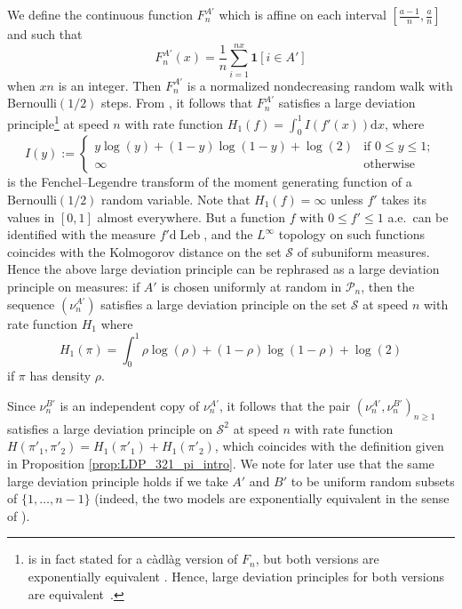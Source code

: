 \documentclass[a4paper,11pt]{amsart}
\newcommand{\One}{\bm 1}
\DeclareMathOperator{\Leb}{Leb}
\theoremstyle{definition}
\begin{document}
We define the continuous function $F_n^{A'}$ which is affine on each interval $[\frac{a-1}{n}, \frac a n ]$ and such that
\[F_n^{A'}(x)=\frac{1}{n} \sum_{i=1}^{nx} \One[i \in A']\]
when $xn$ is an integer. 
Then $F_n^{A'}$ is a normalized nondecreasing random walk with $\mathrm{Bernoulli}(1/2)$ steps.
From \cite[Theorem 5.1.2]{dembo1998large-deviations}, it follows
that $F_n^{A'}$ satisfies a large deviation principle\footnote{
    \cite[Theorem 5.1.2]{dembo1998large-deviations} is in fact stated for a càdlàg version of $F_n$,
    but both versions are exponentially equivalent \cite[Lemma 5.1.4]{dembo1998large-deviations}.
    Hence, large deviation principles for both versions are equivalent~\cite[Theorem 4.2.13]{dembo1998large-deviations}.
} at speed $n$ with rate function
$H_1(f)= \int_{0}^1 I(f'(x)) \mathrm{d}x$,
where 
\[I(y) := \begin{cases}  y \log(y)+(1-y)\log(1-y) +\log(2) & \text{if $0 \le y \le 1$};\\
\infty &\text{otherwise}\end{cases}\] is the Fenchel--Legendre transform of the moment generating function of a 
$\mathrm{Bernoulli}(1/2)$ random variable.
Note that $H_1(f)=\infty$ unless $f'$ takes its values in $[0,1]$ almost everywhere. But a function $f$ with $0 \le f' \le 1$ a.e.~can be identified with the measure $f' \mathrm{d}\Leb$, and the $L^\infty$ topology on such functions coincides with the Kolmogorov distance
on the set $\mathcal S$ of subuniform measures.
Hence the above large deviation principle can be rephrased as a large deviation principle on measures: if $A'$ is chosen uniformly at random in $\mathcal{P}_n$, then the sequence $(\nu_n^{A'})$
 satisfies a large deviation principle  on the set $\mathcal S$ at speed $n$ with rate function $H_1$ where
\[ H_1(\pi)= \int_{0}^1 \rho \log(\rho )+(1-\rho )\log(1-\rho )+\log(2) \]
if $\pi$ has density $\rho.$

Since $\nu_n^{B'}$ is an independent copy of $\nu_n^{A'}$,
it follows that the pair $\left( \nu_n^{A'},\nu_n^{B'}\right)_{n \ge 1}$
satisfies a large deviation principle on $\mathcal S^2$ at speed $n$ with rate function $H(\pi'_1,\pi'_2)=H_1(\pi'_1)+H_1(\pi'_2)$,
which coincides with the definition given in Proposition \ref{prop:LDP_321_pi_intro}.
We note for later use that the same large deviation principle holds if we take $A'$ and $B'$ to be uniform random subsets of $\{1,\dots,n-1\}$
(indeed, the two models are exponentially equivalent in the sense of \cite[Definition 4.2.12]{dembo1998large-deviations}).
\end{document}
